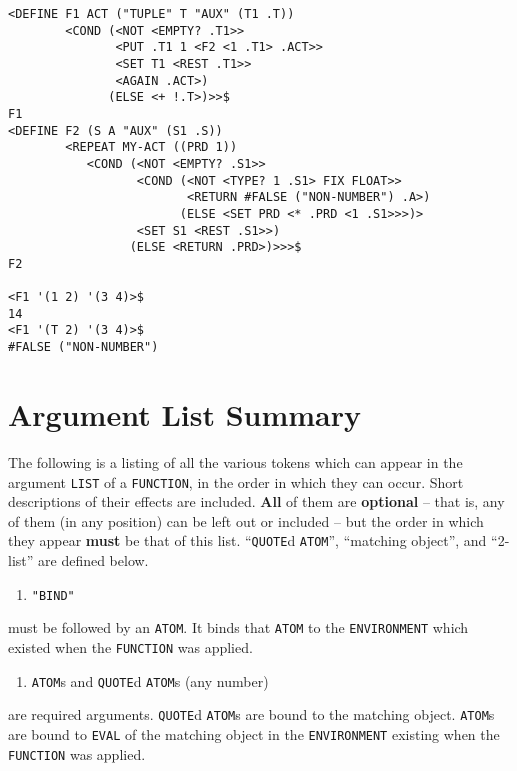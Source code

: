 \documentclass[a4paper]{scrbook}
\providecommand{\tightlist}{%
  \setlength{\itemsep}{0pt}\setlength{\parskip}{0pt}}
\begin{document}
\begin{verbatim}
<DEFINE F1 ACT ("TUPLE" T "AUX" (T1 .T))
        <COND (<NOT <EMPTY? .T1>>
               <PUT .T1 1 <F2 <1 .T1> .ACT>>
               <SET T1 <REST .T1>>
               <AGAIN .ACT>)
              (ELSE <+ !.T>)>>$
F1
<DEFINE F2 (S A "AUX" (S1 .S))
        <REPEAT MY-ACT ((PRD 1))
           <COND (<NOT <EMPTY? .S1>>
                  <COND (<NOT <TYPE? 1 .S1> FIX FLOAT>>
                         <RETURN #FALSE ("NON-NUMBER") .A>)
                        (ELSE <SET PRD <* .PRD <1 .S1>>>)>
                  <SET S1 <REST .S1>>)
                 (ELSE <RETURN .PRD>)>>>$
F2

<F1 '(1 2) '(3 4)>$
14
<F1 '(T 2) '(3 4)>$
#FALSE ("NON-NUMBER")
\end{verbatim}

\section{Argument List Summary}\label{argument-list-summary}

The following is a listing of all the various tokens which can appear in the argument \texttt{LIST} of a \texttt{FUNCTION},
in the order in which they can occur. Short descriptions of their effects are included. \textbf{All} of them are
\textbf{optional} -- that is, any of them (in any position) can be left out or included -- but the order in which they
appear \textbf{must} be that of this list. ``\texttt{QUOTE}d \texttt{ATOM}'', ``matching object'', and ``2-list'' are
defined below.

\begin{enumerate}
\def\labelenumi{(\arabic{enumi})}
\tightlist
\item
  \texttt{"BIND"} 
\end{enumerate}

must be followed by an \texttt{ATOM}. It binds that \texttt{ATOM} to the \texttt{ENVIRONMENT} which existed when the
\texttt{FUNCTION} was applied.

\begin{enumerate}
\def\labelenumi{(\arabic{enumi})}
\setcounter{enumi}{1}
\tightlist
\item
  \texttt{ATOM}s and \texttt{QUOTE}d \texttt{ATOM}s (any number)
\end{enumerate}

are required arguments. \texttt{QUOTE}d \texttt{ATOM}s are bound to the matching object. \texttt{ATOM}s are bound to
\texttt{EVAL} of the matching object in the \texttt{ENVIRONMENT} existing when the \texttt{FUNCTION} was applied.
\end{document}
